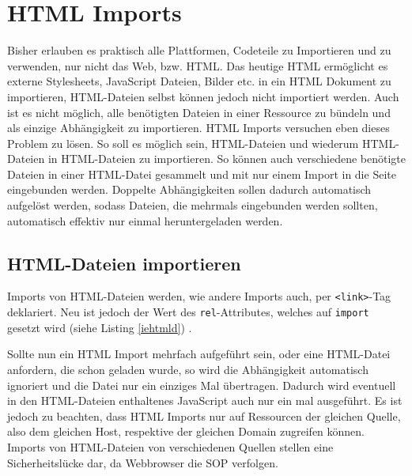 \section{\ac{HTML} Imports}\label{html-imports}

Bisher erlauben es praktisch alle Plattformen, Codeteile zu Importieren und zu verwenden, nur nicht das Web, bzw. \ac{HTML}. Das heutige \ac{HTML} ermöglicht es externe Stylesheets, JavaScript Dateien, Bilder etc. in ein \ac{HTML} Dokument zu importieren, \ac{HTML}-Dateien selbst können jedoch nicht importiert werden. Auch ist es nicht möglich, alle benötigten Dateien in einer Ressource zu bündeln und als einzige Abhängigkeit zu importieren. \ac{HTML} Imports versuchen eben dieses Problem zu lösen. So soll es möglich sein, \ac{HTML}-Dateien und wiederum \ac{HTML}-Dateien in \ac{HTML}-Dateien zu importieren. So können auch verschiedene benötigte Dateien in einer \ac{HTML}-Datei gesammelt und mit nur einem Import in die Seite eingebunden werden. Doppelte Abhängigkeiten sollen dadurch automatisch aufgelöst werden, sodass Dateien, die mehrmals eingebunden werden sollten, automatisch effektiv nur einmal heruntergeladen werden.


\subsection{\ac{HTML}-Dateien importieren}\label{html-dateien-importieren}

Imports von \ac{HTML}-Dateien werden, wie andere Imports auch, per \texttt{\textless{}link\textgreater{}}-Tag deklariert. Neu ist jedoch der Wert des \texttt{rel}-Attributes, welches auf \texttt{import} gesetzt wird (siehe Listing \ref{iehtmld}) \cite[S. 139-147]{citeulike:13844975}.



Sollte nun ein \ac{HTML} Import mehrfach aufgeführt sein, oder eine \ac{HTML}-Datei anfordern, die schon geladen wurde, so wird die Abhängigkeit automatisch ignoriert und die Datei nur ein einziges Mal übertragen. Dadurch wird eventuell in den \ac{HTML}-Dateien enthaltenes JavaScript auch nur ein mal ausgeführt. Es ist jedoch zu beachten, dass \ac{HTML} Imports nur auf Ressourcen der gleichen Quelle, also dem gleichen Host, respektive der gleichen Domain zugreifen können. Imports von \ac{HTML}-Dateien von verschiedenen Quellen stellen eine Sicherheitslücke dar, da Webbrowser die \ac{SOP} verfolgen.

